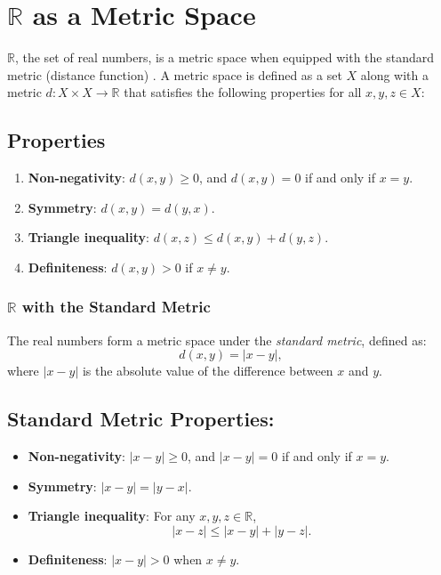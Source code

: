 \section{\( \mathbb{R} \) as a Metric Space} \label{sub:metric_space}
\( \mathbb{R} \), the set of real numbers, is a metric space when equipped with the standard metric (distance function) \cite{rudin1976}. A metric space is defined as a set \( X \) along with a metric \( d: X \times X \to \mathbb{R} \) that satisfies the following properties for all \( x, y, z \in X \):

\subsection{Properties}
\begin{enumerate}[noitemsep, left=1cm, topsep=0pt]
    \item \textbf{Non-negativity}: \( d(x, y) \geq 0 \), and \( d(x, y) = 0 \) if and only if \( x = y \).
    \item \textbf{Symmetry}: \( d(x, y) = d(y, x) \).
    \item \textbf{Triangle inequality}: \( d(x, z) \leq d(x, y) + d(y, z) \).
    \item \textbf{Definiteness}: \( d(x, y) > 0 \) if \( x \neq y \).
\end{enumerate}

\subsubsection{ \( \mathbb{R} \) with the Standard Metric}

The real numbers form a metric space under the \textit{standard metric}, defined as:
\[
d(x, y) = |x - y|,
\]
where \( |x - y| \) is the absolute value of the difference between \( x \) and \( y \).

\subsection{Standard Metric Properties:}

\begin{itemize}
    \item \textbf{Non-negativity}: \( |x - y| \geq 0 \), and \( |x - y| = 0 \) if and only if \( x = y \).
    \item \textbf{Symmetry}: \( |x - y| = |y - x| \).
    \item \textbf{Triangle inequality}: For any \( x, y, z \in \mathbb{R} \),
    \[
    |x - z| \leq |x - y| + |y - z|.
    \]
    \item \textbf{Definiteness}: \( |x - y| > 0 \) when \( x \neq y \).
\end{itemize}

